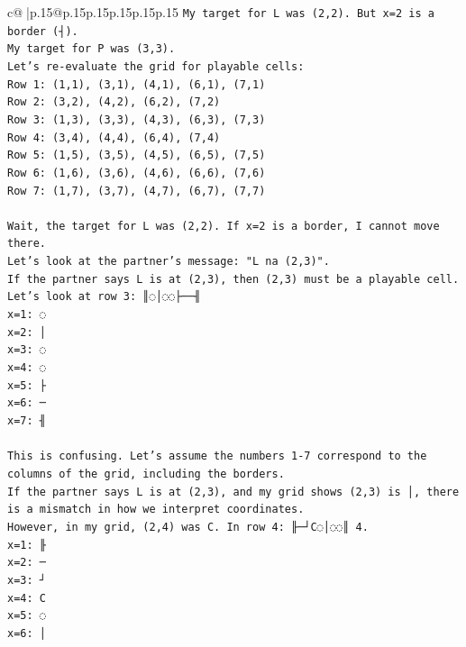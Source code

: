 \documentclass{article}
\begin{document}
{\begin{supertabular}{c@{$\;$}|p{.15\linewidth}@{}p{.15\linewidth}p{.15\linewidth}p{.15\linewidth}p{.15\linewidth}p{.15\linewidth}}
{{{\texttt{My target for L was (2,2). But x=2 is a border (┤).} \\
\texttt{My target for P was (3,3).} \\
\texttt{Let's re{-}evaluate the grid for playable cells:} \\
\texttt{Row 1: (1,1), (3,1), (4,1), (6,1), (7,1)} \\
\texttt{Row 2: (3,2), (4,2), (6,2), (7,2)} \\
\texttt{Row 3: (1,3), (3,3), (4,3), (6,3), (7,3)} \\
\texttt{Row 4: (3,4), (4,4), (6,4), (7,4)} \\
\texttt{Row 5: (1,5), (3,5), (4,5), (6,5), (7,5)} \\
\texttt{Row 6: (1,6), (3,6), (4,6), (6,6), (7,6)} \\
\texttt{Row 7: (1,7), (3,7), (4,7), (6,7), (7,7)} \\
\\ 
\texttt{Wait, the target for L was (2,2). If x=2 is a border, I cannot move there.} \\
\texttt{Let's look at the partner's message: "L na (2,3)".} \\
\texttt{If the partner says L is at (2,3), then (2,3) must be a playable cell.} \\
\texttt{Let's look at row 3: ║◌│◌◌├──╢} \\
\texttt{x=1: ◌} \\
\texttt{x=2: │} \\
\texttt{x=3: ◌} \\
\texttt{x=4: ◌} \\
\texttt{x=5: ├} \\
\texttt{x=6: ─} \\
\texttt{x=7: ╢} \\
\\ 
\texttt{This is confusing. Let's assume the numbers 1{-}7 correspond to the columns of the grid, including the borders.} \\
\texttt{If the partner says L is at (2,3), and my grid shows (2,3) is │, there is a mismatch in how we interpret coordinates.} \\
\texttt{However, in my grid, (2,4) was C. In row 4: ╟─┘C◌│◌◌║ 4.} \\
\texttt{x=1: ╟} \\
\texttt{x=2: ─} \\
\texttt{x=3: ┘} \\
\texttt{x=4: C} \\
\texttt{x=5: ◌} \\
\texttt{x=6: │} \\
}}}
\end{supertabular}}
\end{document}
